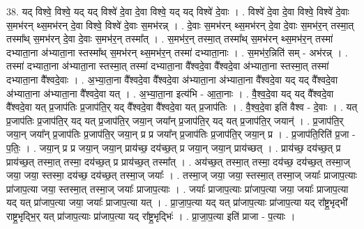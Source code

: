 \documentclass[17pt]{extarticle}
\begin{document}
38. यद् विश्वे॒ विश्वे॒ यद् यद् विश्वे॑ दे॒वा दे॒वा विश्वे॒ यद् यद् विश्वे॑ दे॒वाः । . विश्वे॑ दे॒वा दे॒वा विश्वे॒ विश्वे॑ दे॒वाः स॒मभ॑रन् थ्स॒मभ॑रन् दे॒वा विश्वे॒ विश्वे॑ दे॒वाः स॒मभ॑रन्न् । . दे॒वाः स॒मभ॑रन् थ्स॒मभ॑रन् दे॒वा दे॒वाः स॒मभ॑र॒न् तस्मा॒त् तस्मा᳚थ् स॒मभ॑रन् दे॒वा दे॒वाः स॒मभ॑र॒न् तस्मा᳚त् । . स॒मभ॑र॒न् तस्मा॒त् तस्मा᳚थ् स॒मभ॑रन् थ्स॒मभ॑र॒न् तस्मा॑ दभ्याता॒ना अ॑भ्याता॒ना स्तस्मा᳚थ् स॒मभ॑रन् 
थ्स॒मभ॑र॒न् तस्मा॑ दभ्याता॒नाः । . स॒मभ॑र॒न्निति॑ सम् - अभ॑रन्न् । . तस्मा॑ दभ्याता॒ना अ॑भ्याता॒ना स्तस्मा॒त् तस्मा॑ दभ्याता॒ना वै᳚श्वदे॒वा वै᳚श्वदे॒वा अ॑भ्याता॒ना स्तस्मा॒त् तस्मा॑ दभ्याता॒ना वै᳚श्वदे॒वाः । . अ॒भ्या॒ता॒ना वै᳚श्वदे॒वा वै᳚श्वदे॒वा अ॑भ्याता॒ना अ॑भ्याता॒ना वै᳚श्वदे॒वा यद् यद् वै᳚श्वदे॒वा अ॑भ्याता॒ना 
अ॑भ्याता॒ना वै᳚श्वदे॒वा यत् । . अ॒भ्या॒ता॒ना इत्य॑भि - आ॒ता॒नाः । . वै॒श्व॒दे॒वा यद् यद् वै᳚श्वदे॒वा वै᳚श्वदे॒वा यत् प्र॒जाप॑तिः प्र॒जाप॑ति॒र् यद् वै᳚श्वदे॒वा वै᳚श्वदे॒वा यत् प्र॒जाप॑तिः । . वै॒श्व॒दे॒वा इति॑ वैश्व - दे॒वाः । . यत् प्र॒जाप॑तिः प्र॒जाप॑ति॒र् यद् यत् प्र॒जाप॑ति॒र् जया॒न् जया᳚न् प्र॒जाप॑ति॒र् यद् यत् प्र॒जाप॑ति॒र् जयान्॑ । . प्र॒जाप॑ति॒र् जया॒न् जया᳚न् प्र॒जाप॑तिः प्र॒जाप॑ति॒र् जया॒न् प्र प्र जया᳚न् प्र॒जाप॑तिः प्र॒जाप॑ति॒र् जया॒न् प्र । . प्र॒जाप॑ति॒रिति॑ प्र॒जा - प॒तिः॒ । . जया॒न् प्र प्र जया॒न् जया॒न् प्राय॑च्छ॒ दय॑च्छ॒त् प्र जया॒न् जया॒न् प्राय॑च्छत् । . प्राय॑च्छ॒ दय॑च्छ॒त् प्र प्राय॑च्छ॒त् तस्मा॒त् तस्मा॒ दय॑च्छ॒त् प्र प्राय॑च्छ॒त् तस्मा᳚त् । . अय॑च्छ॒त् तस्मा॒त् तस्मा॒ दय॑च्छ॒ दय॑च्छ॒त् तस्मा॒ज् जया॒ जया॒ स्तस्मा॒ दय॑च्छ॒ दय॑च्छ॒त् तस्मा॒ज् जयाः᳚ । . तस्मा॒ज् जया॒ जया॒ स्तस्मा॒त् तस्मा॒ज् जयाः᳚ प्राजाप॒त्याः प्रा॑जाप॒त्या जया॒ स्तस्मा॒त् तस्मा॒ज् जयाः᳚ प्राजाप॒त्याः । . जयाः᳚ प्राजाप॒त्याः प्रा॑जाप॒त्या जया॒ जयाः᳚ प्राजाप॒त्या यद् यत् प्रा॑जाप॒त्या जया॒ जयाः᳚ प्राजाप॒त्या यत् । . प्रा॒जा॒प॒त्या यद् यत् प्रा॑जाप॒त्याः प्रा॑जाप॒त्या यद् रा᳚ष्ट्र॒भृद्भी॑ राष्ट्र॒भृद्भि॒र् यत् प्रा॑जाप॒त्याः प्रा॑जाप॒त्या यद् रा᳚ष्ट्र॒भृद्भिः॑ । . प्रा॒जा॒प॒त्या इति॑ प्राजा - प॒त्याः । \newline
\pagebreak
{}
\end{document}
